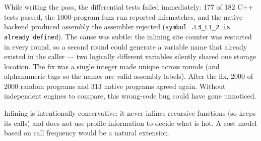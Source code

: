 \begin{bugbox}
While writing the pass, the differential tests failed immediately: 177 of 182 C++ tests passed, the 1000-program fuzz run reported mismatches, and the native backend produced assembly the assembler rejected (\texttt{symbol .L3\_L1\_2 is already defined}). The cause was subtle: the inlining site counter was restarted in every round, so a second round could generate a variable name that already existed in the caller --- two logically different variables silently shared one storage location. The fix was a single integer made unique across rounds (and alphanumeric tags so the names are valid assembly labels). After the fix, 2000 of 2000 random programs and 313 native programs agreed again. Without independent engines to compare, this wrong-code bug could have gone unnoticed.
\end{bugbox}

\begin{warnbox}
Inlining is intentionally conservative: it never inlines recursive functions (so  keeps its calls) and does not use profile information to decide what is hot. A cost model based on call frequency would be a natural extension.
\end{warnbox}
